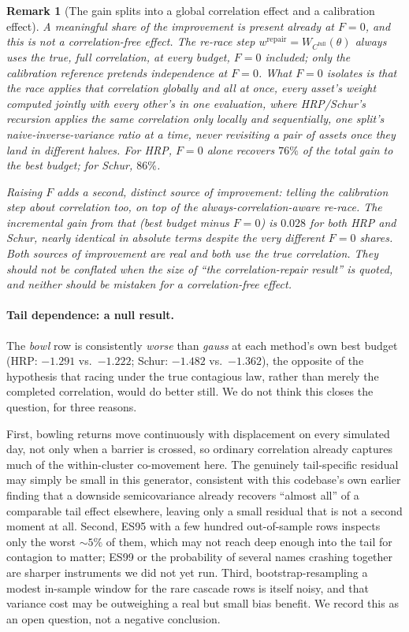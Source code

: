 \documentclass[11pt]{article}
\newtheorem{remark}{Remark}
\begin{document}
\begin{remark}[The gain splits into a global correlation effect and a
calibration effect]
A meaningful share of the improvement is present already at $F=0$, and this
is not a correlation-free effect. The re-race step
$w^{\mathrm{repair}}=W_{C^{\mathrm{full}}}(\theta)$ always uses the true,
full correlation, at every budget, $F=0$ included; only the
\emph{calibration} reference pretends independence at $F=0$. What $F=0$
isolates is that the race applies that correlation \emph{globally and all at
once}, every asset's weight computed jointly with every other's in one
evaluation, where HRP/Schur's recursion applies the same correlation only
\emph{locally and sequentially}, one split's naive-inverse-variance ratio at
a time, never revisiting a pair of assets once they land in different
halves. For HRP, $F=0$ alone recovers $76\%$ of the total gain to the best
budget; for Schur, $86\%$.

Raising $F$ adds a second, distinct source of improvement: telling the
\emph{calibration} step about correlation too, on top of the
always-correlation-aware re-race. The \emph{incremental} gain from that
(best budget minus $F=0$) is $0.028$ for both HRP and Schur, nearly
identical in absolute terms despite the very different $F=0$ shares. Both
sources of improvement are real and both use the true correlation. They
should not be conflated when the size of ``the correlation-repair result''
is quoted, and neither should be mistaken for a correlation-free effect.
\end{remark}

\paragraph{Tail dependence: a null result.} The \emph{bowl} row is
consistently \emph{worse} than \emph{gauss} at each method's own best budget
(HRP: $-1.291$ vs.\ $-1.222$; Schur: $-1.482$ vs.\ $-1.362$), the opposite of
the hypothesis that racing under the true contagious law, rather than merely
the completed correlation, would do better still. We do not think this
closes the question, for three reasons.

First, bowling returns move continuously with displacement on every
simulated day, not only when a barrier is crossed, so ordinary correlation
already captures much of the within-cluster co-movement here. The genuinely
tail-specific residual may simply be small in this generator, consistent
with this codebase's own earlier finding that a downside semicovariance
already recovers ``almost all'' of a comparable tail effect elsewhere,
leaving only a small residual that is not a second moment at all. Second,
ES95 with a few hundred out-of-sample rows inspects only the worst
$\sim\!5\%$ of them, which may not reach deep enough into the tail for
contagion to matter; ES99 or the probability of several names crashing
together are sharper instruments we did not yet run. Third,
bootstrap-resampling a modest in-sample window for the rare cascade rows is
itself noisy, and that variance cost may be outweighing a real but small
bias benefit. We record this as an open question, not a negative conclusion.
\end{document}
